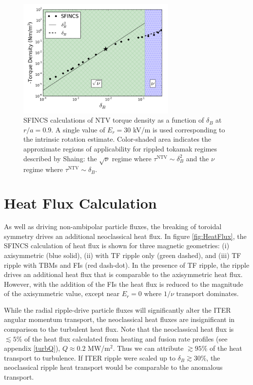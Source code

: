 \documentclass[aip, pop, preprint]{revtex4-1}
\numberwithin{figure}{section}
\numberwithin{equation}{section}
\begin{document}
\begin{figure}[h!]
\centering
\includegraphics[width=0.7\textwidth]
{scalescan.png}
\caption{\label{fig:scalescan} SFINCS calculations of NTV torque density as a function of $\delta_B$ at $r/a = 0.9$. A single value of $E_r = 30$ kV/m is used corresponding to the intrinsic rotation estimate. Color-shaded area indicates the approximate regions of applicability for rippled tokamak regimes described by Shaing: the $\sqrt{\nu}$ regime where $\tau^{\text{NTV}} \sim \delta_B^2$\cite{Shaing2008} and the $\nu$ regime where $\tau^{\text{NTV}} \sim \delta_B$.\cite{Shaing2009} }
\end{figure} 

\FloatBarrier

\section{Heat Flux Calculation}\label{heatflux}
As well as driving non-ambipolar particle fluxes, the breaking of toroidal symmetry drives an additional neoclassical heat flux. In figure \ref{fig:HeatFlux}, the SFINCS calculation of heat flux is shown for three magnetic geometries: (i) axisymmetric (blue solid), (ii) with TF ripple only (green dashed), and (iii) TF ripple with TBMs and FIs (red dash-dot). In the presence of TF ripple, the ripple drives an additional heat flux that is comparable to the axisymmetric heat flux. However, with the addition of the FIs the heat flux is reduced to the magnitude of the axisymmetric value, except near $E_r = 0$ where $1/\nu$ transport dominates. 

While the radial ripple-drive particle fluxes will significantly alter the ITER angular momentum transport, the neoclassical heat fluxes are insignificant in comparison to the turbulent heat flux. Note that the neoclassical heat flux is $\lesssim 5\%$  of the heat flux calculated from heating and fusion rate profiles (see appendix \ref{turbQ}), $Q\approx 0.2$ MW/m$^2$. Thus we can attribute $\gtrsim 95\%$ of the heat transport to turbulence. If ITER ripple were scaled up to $\delta_B \gtrsim 30\%$, the neoclassical ripple heat transport would be comparable to the anomalous transport.
\end{document}

